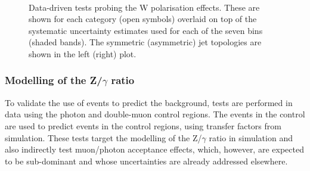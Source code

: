 \begin{figure}[h!]
  \begin{center}
    ~~
    \caption{Data-driven tests probing the W polarisation effects. 
      These are shown for each
      \njet category (open symbols) overlaid on top of the systematic
      uncertainty estimates used for each of the seven \scalht bins
      (shaded bands). 
      The symmetric (asymmetric) jet topologies are shown in the left (right) plot.       
    }
    \label{fig:closureMuPToMuM}
  \end{center} 
\end{figure}



\subsubsection*{Modelling of the Z/$\gamma$ ratio}
\label{sec:tfSyst_ZGratio}
To validate the use of \gj events to predict the \znunu
background, tests are performed in data using the photon and double-muon control regions. 
The events in the \gj control are used to predict events in the \mmj control regions, 
using transfer factors from simulation. 
These tests target the modelling of the Z/$\gamma$ ratio in simulation and 
also indirectly test muon/photon acceptance effects, which, however, 
are expected to be sub-dominant and whose uncertainties are already addressed elsewhere. 

